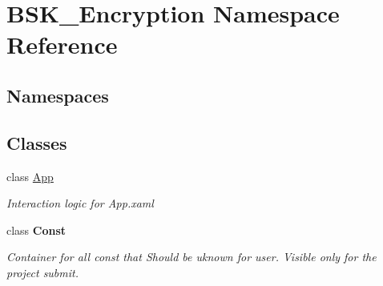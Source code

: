 \hypertarget{namespace_b_s_k___encryption}{}\section{B\+S\+K\+\_\+\+Encryption Namespace Reference}
\label{namespace_b_s_k___encryption}
\subsection*{Namespaces}
\begin{DoxyCompactItemize}
\end{DoxyCompactItemize}
\subsection*{Classes}
\begin{DoxyCompactItemize}
\item 
class \mbox{\hyperlink{class_b_s_k___encryption_1_1_app}{App}}
\begin{DoxyCompactList}\small\item\em Interaction logic for App.\+xaml \end{DoxyCompactList}\item 
class {\bfseries Const}
\begin{DoxyCompactList}\small\item\em Container for all const that Should be uknown for user. Visible only for the project submit. \end{DoxyCompactList}\end{DoxyCompactItemize}
